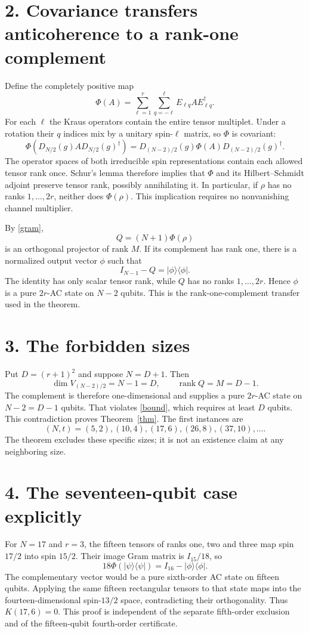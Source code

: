 \documentclass[11pt]{article}
\begin{document}
\section*{2. Covariance transfers anticoherence to a rank-one complement}
Define the completely positive map
\[
 \Phi(A)=\sum_{\ell=1}^{r}\sum_{q=-\ell}^{\ell}
 E_{\ell q}A E_{\ell q}^{\dagger}.
\]
For each $\ell$ the Kraus operators contain the entire tensor multiplet.
Under a rotation their $q$ indices mix by a unitary spin-$\ell$ matrix,
so $\Phi$ is covariant:
\[
 \Phi(D_{N/2}(g)A D_{N/2}(g)^{\dagger})
 =D_{(N-2)/2}(g)\Phi(A)D_{(N-2)/2}(g)^{\dagger}.
\]
The operator spaces of both irreducible spin representations contain each
allowed tensor rank once. Schur's lemma therefore implies that $\Phi$ and
its Hilbert--Schmidt adjoint preserve tensor rank, possibly annihilating
it. In particular, if $\rho$ has no ranks $1,\ldots,2r$, neither does
$\Phi(\rho)$. This implication requires no nonvanishing channel multiplier.

By \eqref{gram},
\[
 Q=(N+1)\Phi(\rho)
\]
is an orthogonal projector of rank $M$. If its complement has rank one,
there is a normalized output vector $\phi$ such that
\[
 I_{N-1}-Q=|\phi\rangle\langle\phi|.
\]
The identity has only scalar tensor rank, while $Q$ has no ranks
$1,\ldots,2r$. Hence $\phi$ is a pure $2r$-AC state on $N-2$ qubits.
This is the rank-one-complement transfer used in the theorem.

\section*{3. The forbidden sizes}
Put $D=(r+1)^2$ and suppose $N=D+1$. Then
\[
 \dim V_{(N-2)/2}=N-1=D,\qquad\operatorname{rank}Q=M=D-1.
\]
The complement is therefore one-dimensional and supplies a pure $2r$-AC
state on $N-2=D-1$ qubits. That violates \eqref{bound}, which requires at
least $D$ qubits. This contradiction proves Theorem~\ref{thm}.
The first instances are
\[
 (N,t)=(5,2),(10,4),(17,6),(26,8),(37,10),\ldots.
\]
The theorem excludes these specific sizes; it is not an existence claim
at any neighboring size.

\section*{4. The seventeen-qubit case explicitly}
For $N=17$ and $r=3$, the fifteen tensors of ranks one, two and three map
spin $17/2$ into spin $15/2$. Their image Gram matrix is $I_{15}/18$, so
\[
 18\Phi(|\psi\rangle\langle\psi|)=I_{16}-|\phi\rangle\langle\phi|.
\]
The complementary vector would be a pure sixth-order AC state on fifteen
qubits. Applying the same fifteen rectangular tensors to that state maps
into the fourteen-dimensional spin-$13/2$ space, contradicting their
orthogonality. Thus $K(17,6)=0$. This proof is independent of the separate
fifth-order exclusion and of the fifteen-qubit fourth-order certificate.
\end{document}
